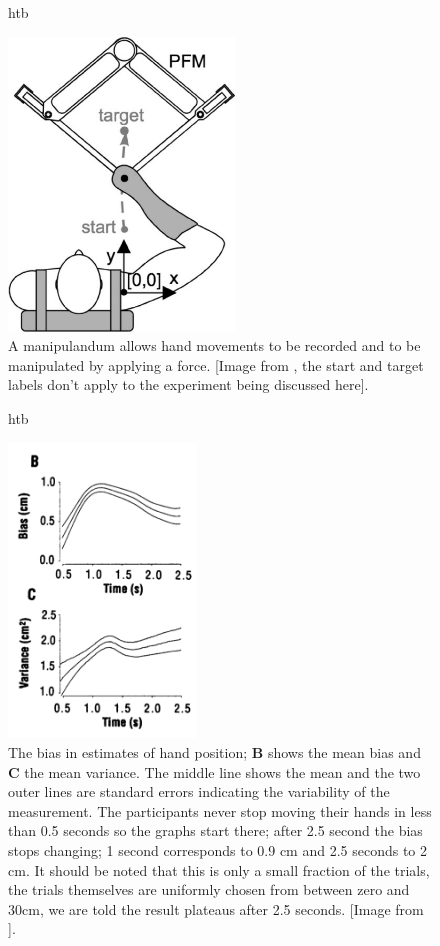 \documentclass[12pt]{article}
\begin{document}
\begin{figure}{htb}
\begin{center}
  \includegraphics[width=6cm]{manipulandum.jpg}
\end{center}
\caption{A manipulandum allows hand movements to be recorded and to be
  manipulated by applying a force. [Image from \cite{MistryEt2013},
    the start and target labels don't apply to the experiment being
    discussed here].\label{fig_manipulandum}}
\end{figure}


\begin{figure}{htb}
\begin{center}
  \includegraphics[width=5cm]{fig_overestimate.png}
\end{center}
\caption{The bias in estimates of hand position; \textbf{B} shows the
  mean bias and \textbf{C} the mean variance. The middle line shows
  the mean and the two outer lines are standard errors indicating the
  variability of the measurement. The participants never stop moving
  their hands in less than 0.5 seconds so the graphs start there;
  after 2.5 second the bias stops changing; 1 second corresponds to
  0.9 cm and 2.5 seconds to 2 cm. It should be noted that this is only
  a small fraction of the trials, the trials themselves are uniformly
  chosen from between zero and 30cm, we are told the result plateaus after 2.5 seconds. [Image from
    \cite{WolpertEtAl1995}].\label{fig_manipulandum}}
\end{figure}
\end{document}
